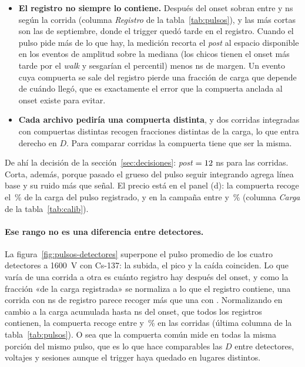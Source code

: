\documentclass[11pt,a4paper]{article}
\begin{document}
\begin{itemize}
\item \textbf{El registro no siempre lo contiene.} Después del onset
      sobran entre \RegistroMin{} y \RegistroMax{} ns según la corrida
      (columna \emph{Registro} de la tabla~\ref{tab:pulsos}), y las más
      cortas son las de septiembre, donde el trigger quedó tarde en el
      registro. Cuando el pulso
      pide más de lo que hay, la medición recorta el \emph{post} al espacio
      disponible en los eventos de amplitud sobre la mediana (los chicos tienen
      el onset más tarde por el \emph{walk} y sesgarían el percentil) menos
      \MargenRegistro{} ns de margen. Un evento cuya compuerta se sale del
      registro pierde una fracción de carga que depende de cuándo llegó, que
      es exactamente el error que la compuerta anclada al onset existe para
      evitar.
\item \textbf{Cada archivo pediría una compuerta distinta}, y dos corridas
      integradas con compuertas distintas recogen fracciones distintas de la
      carga, lo que entra derecho en $D$. Para comparar corridas la compuerta
      tiene que ser la misma.
\end{itemize}

De ahí la decisión de la sección~\ref{sec:decisiones}: \emph{post} $=
12$ ns para las \NCorridas{} corridas. Corta, además, porque pasado el
grueso del pulso seguir integrando agrega línea base y su ruido más que señal.
El precio está en el panel (d): la compuerta recoge el \EjCarga\,\% de la carga
del pulso registrado, y en la campaña entre \CargaMin{} y \CargaMax\,\%
(columna \emph{Carga} de la tabla~\ref{tab:calib}).

\paragraph{Ese rango no es una diferencia entre detectores.} La
figura~\ref{fig:pulsos-detectores} superpone el pulso promedio de los cuatro
detectores a 1600~V con Cs-137: la subida, el pico y la caída coinciden. Lo que
varía de una corrida a otra es cuánto registro hay después del onset, y como
la fracción «de la carga registrada» se normaliza a lo que el registro
contiene, una corrida con \RegistroMin{} ns de registro parece recoger más que
una con \RegistroMax. Normalizando en cambio a la carga acumulada hasta
\TComun{} ns del onset, que todos los registros contienen, la compuerta recoge
entre \CargaComunMin{} y \CargaComunMax\,\% en las \NCorridas{} corridas
(última columna de la tabla~\ref{tab:pulsos}). O sea que la compuerta común
mide en todas la misma porción del mismo pulso, que es lo que hace comparables
las $D$ entre detectores, voltajes y sesiones aunque el trigger haya quedado en
lugares distintos.
\end{document}
